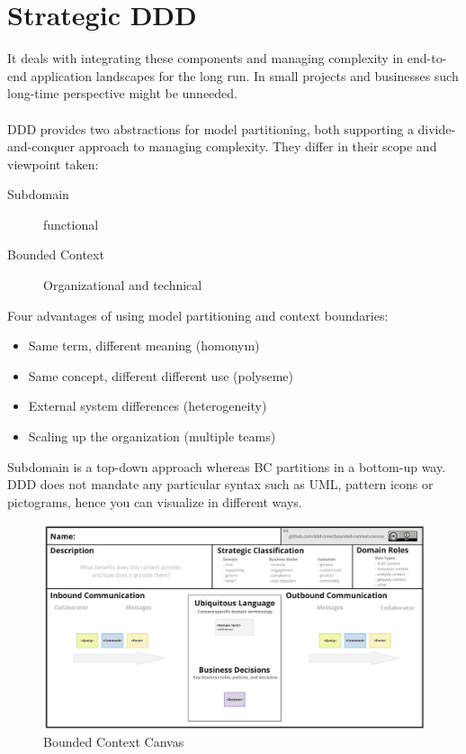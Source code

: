 \documentclass[../Main.tex]{subfiles}
\begin{document}
\section{Strategic DDD}

It deals with integrating these components and managing complexity in end-to-end application landscapes for the long run.
In small projects and businesses such long-time perspective might be unneeded.
\\\\
DDD provides two abstractions for model partitioning, both supporting a divide-and-conquer approach to managing complexity.
They differ in their scope and viewpoint taken:
\begin{description}
    \item[Subdomain] functional
    \item[Bounded Context] Organizational and technical  
\end{description}

Four advantages of using model partitioning and context boundaries:
\begin{itemize}
    \item Same term, different meaning (homonym)
    \item Same concept, different different use (polyseme)
    \item External system differences (heterogeneity)
    \item Scaling up the organization (multiple teams)
\end{itemize}

Subdomain is a top-down approach whereas BC partitions in a bottom-up way.
DDD does not mandate any particular syntax such as UML, pattern icons or pictograms, hence you can visualize in different ways.

\begin{figure}[H]
    \centering
    \includegraphics[width=1\linewidth]{Images/bounded-context-canvas.png}
    \caption{Bounded Context Canvas}
\end{figure}
\end{document}
